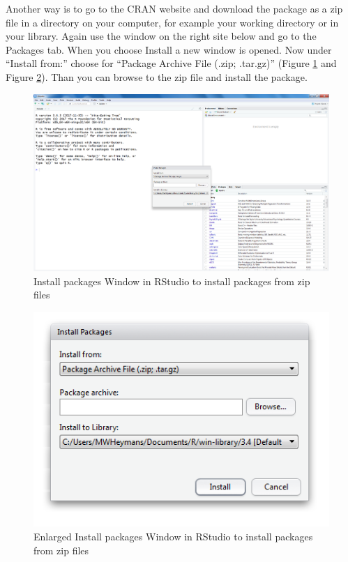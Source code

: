 \documentclass[]{book}
\begin{document}
Another way is to go to the CRAN website and download the package as a
zip file in a directory on your computer, for example your working
directory or in your library. Again use the window on the right site
below and go to the Packages tab. When you choose Install a new window
is opened. Now under ``Install from:'' choose for ``Package Archive File
(.zip; .tar.gz)'' (Figure \ref{fig:fig27} and Figure \ref{fig:fig28}).
Than you can browse to the zip file and install the package.

\begin{figure}

{\centering \includegraphics[width=0.95\linewidth]{images/fig1.26a} 

}

\caption{Install packages Window in RStudio to install packages from zip files}\label{fig:fig27}
\end{figure}

\begin{figure}

{\centering \includegraphics[width=0.95\linewidth]{images/fig1.26b} 

}

\caption{Enlarged Install packages Window in RStudio to install packages from zip files}\label{fig:fig28}
\end{figure}
\end{document}
